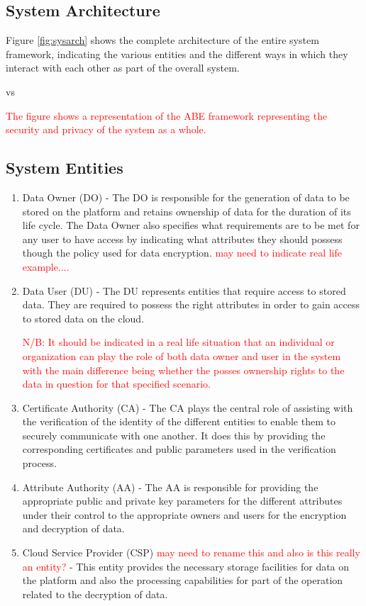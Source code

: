 \subsection{System Architecture}

Figure \ref{fig:sysarch} shows the complete architecture of the entire system framework, indicating the various entities and the different ways in which they interact with each other as part of the overall system.

vs 

\textcolor{red}{The figure shows a representation of the ABE framework representing the security and privacy of the system as a whole.}

\subsection*{System Entities}

\begin{enumerate}[label=(\arabic*)]
	\item Data Owner (DO) - The DO is responsible for the generation of data to be stored on the platform and retains ownership of data for the duration of its life cycle. The Data Owner also specifies what requirements are to be met for any user to have access by indicating what attributes they should possess though the policy used for data encryption. \textcolor{red}{may need to indicate real life example....}
	
	\item Data User (DU) - The DU represents entities that require access to stored data. They are required to possess the right attributes in order to gain access to stored data on the cloud.
	
	\textcolor{red}{N/B: It should be indicated in a real life situation that an individual or organization can play the role of both data owner and user in the system with the main difference being whether the posses ownership rights to the data in question for that specified scenario.}
	
	\item Certificate Authority (CA) - The CA plays the central role of assisting with the verification of the identity of the different entities to enable them to securely communicate with one another. It does this by providing the corresponding certificates and public parameters used in the verification process.
	
	\item Attribute Authority (AA) - The AA is responsible for providing the appropriate public and private key parameters for the different attributes under their control to the appropriate owners and users for the encryption and decryption of data. 
	
	\item Cloud Service Provider (CSP) \textcolor{red}{may need to rename this and also is this really an entity?} - This entity provides the necessary storage facilities for data on the platform and also the processing capabilities for part of the operation related to the decryption of data.
	
\end{enumerate}


